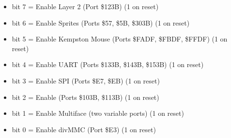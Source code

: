 \begin{itemize}
\item bit 7 = Enable Layer 2 (Port \$123B) (1 on reset)
\item bit 6 = Enable Sprites (Ports \$57, \$5B, \$303B) (1 on reset)
\item bit 5 = Enable Kempston Mouse (Ports \$FADF, \$FBDF, \$FFDF) (1
  on reset)
\item bit 4 = Enable UART (Ports \$133B, \$143B, \$153B) (1 on reset)
\item bit 3 = Enable SPI (Ports \$E7, \$EB) (1 on reset)
\item bit 2 = Enable \iic (Ports \$103B, \$113B) (1 on reset)
\item bit 1 = Enable Multiface (two variable ports) (1 on reset)
\item bit 0 = Enable divMMC (Port \$E3) (1 on reset)
\end{itemize}

